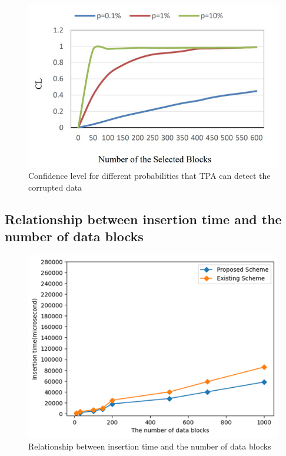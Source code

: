\begin{figure}[H]
    \centering
    \includegraphics[scale=0.8]{figures/Confidence level.png}
    \caption{Confidence level for different probabilities that TPA can detect the corrupted data}
 
\end{figure}
\vspace{0.5cm}



\subsection{Relationship between insertion time and the number of data blocks}

\begin{figure}[H]
    \centering
    \includegraphics[scale=0.85]{figures/insertion time and data blocks.png}
    \caption{Relationship between insertion time and the number of data blocks}
 
\end{figure}
\vspace{0.5cm}



